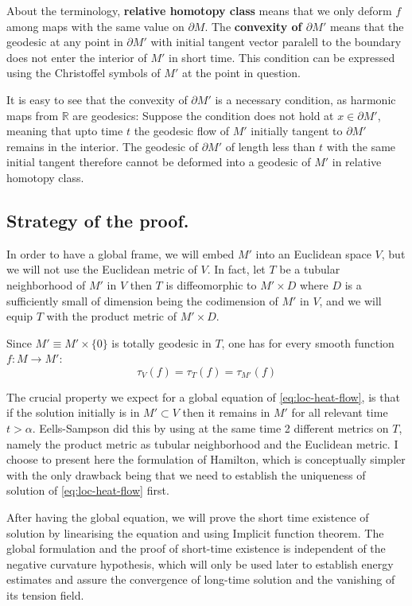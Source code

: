 About the terminology, \textbf{relative homotopy class} means that we only deform \(f\) among
maps with the same value on \(\partial M\). The \textbf{convexity of \(\partial M'\)} means
that the geodesic at any point in \(\partial M'\) with initial tangent vector paralell
to the boundary does not enter the interior of \(M'\) in short time. This condition can be expressed
using  the Christoffel symbols of \(M'\) at the point in question.

It is easy to see that the convexity of \(\partial M'\) is a necessary condition, as
harmonic maps from \(\mathbb{R}\) are geodesics: Suppose the condition does not hold at
\(x\in \partial M'\), meaning that upto time \(t\) the geodesic flow of \(M'\) initially tangent to
\(\partial M'\) remains in the interior. The geodesic of \(\partial M'\) of length
less than \(t\) with the same initial tangent therefore cannot be deformed into a
geodesic of \(M'\) in relative homotopy class. 

\subsection{Strategy of the proof.}
\label{sec:org50fd7bd}
In order to have a global frame, we will embed \(M'\) into an Euclidean space \(V\),
but we will not use the Euclidean metric of \(V\). In fact, let \(T\) be a tubular
neighborhood of \(M'\) in \(V\) then \(T\) is diffeomorphic to \(M'\times D\)
where \(D\) is a sufficiently small of dimension being the codimension of \(M'\) in \(V\), and we will equip \(T\) with the product metric of \(M'\times D\). 

Since \(M' \equiv M'\times \{0\}\) is totally geodesic in \(T\), one has for every smooth
function \(f: M \longrightarrow M'\):
\[
 \tau_V (f) = \tau_T(f) = \tau_{M'} (f)
\]

The crucial property we expect for a global equation of \eqref{eq:loc-heat-flow}, is that if
the solution initially is in \(M'\subset V\) then it remains in \(M'\) for all
relevant time \(t>\alpha\). Eells-Sampson \cite{eells_harmonic_1964} did this by using at
the same time 2 different metrics on \(T\), namely the product metric as tubular
neighborhood and the Euclidean metric. I choose to present here the formulation of
Hamilton, which is conceptually simpler with the only drawback being that we need to
establish the uniqueness of solution of \eqref{eq:loc-heat-flow} first.

After having the global equation, we will prove the short time existence of solution by
linearising the equation and using Implicit function theorem. The global formulation and the
proof of short-time existence is independent of the negative curvature hypothesis, which
will only be used later to establish energy estimates and assure the convergence of
long-time solution and the vanishing of its tension field.


